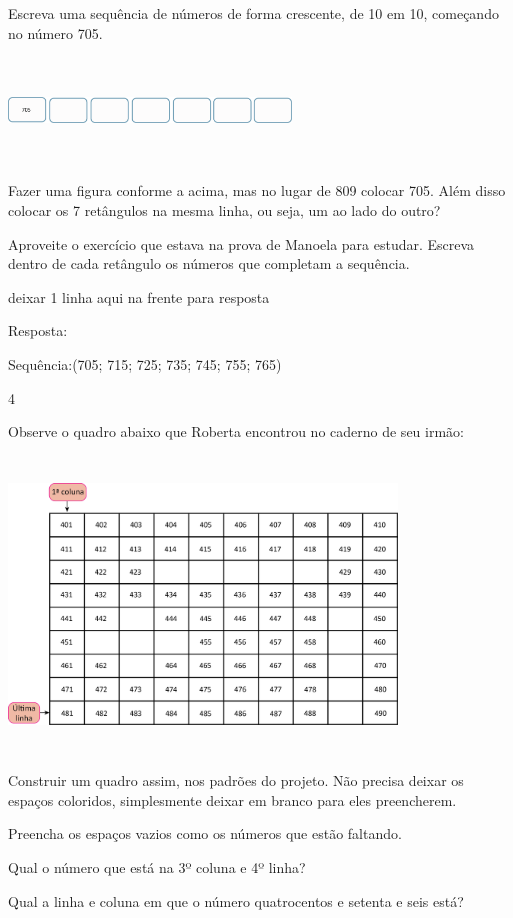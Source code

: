 Escreva uma sequência de números de forma crescente, de 10 em 10,
começando no número 705.

\includegraphics[width=2.95859in,height=1.10010in]{media/image29.png}

Fazer uma figura conforme a acima, mas no lugar de 809 colocar 705. Além
disso colocar os 7 retângulos na mesma linha, ou seja, um ao lado do
outro?

Aproveite o exercício que estava na prova de Manoela para estudar.
Escreva dentro de cada retângulo os números que completam a sequência.

deixar 1 linha aqui na frente para resposta

Resposta:

Sequência:(705; 715; 725; 735; 745; 755; 765)

\num{4}

Observe o quadro abaixo que Roberta encontrou no caderno de seu irmão:

\includegraphics[width=4.05869in,height=3.09193in]{media/image30.png}

Construir um quadro assim, nos padrões do projeto. Não precisa deixar os
espaços coloridos, simplesmente deixar em branco para eles preencherem.

\begin{escolha}
\item
  Preencha os espaços vazios como os números que estão faltando.

\item
  Qual o número que está na 3º coluna e 4º linha?


\item
  Qual a linha e coluna em que o número quatrocentos e setenta e seis
  está?

\end{escolha}

